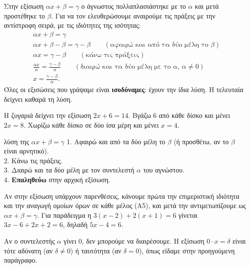 Στην εξίσωση $\alpha x+\beta=\gamma$ ο άγνωστος πολλαπλασιάστηκε με το $\alpha$ και μετά προστέθηκε το $\beta$. Για να τον ελευθερώσουμε αναιρούμε τις πράξεις με την αντίστροφη σειρά, με τις ιδιότητες της ισότητας:
\begin{gather*}
\alpha x+\beta=\gamma\\
\alpha x+\beta-\beta=\gamma-\beta\qquad(\text{αφαιρώ και από τα δύο μέλη το }\beta)\\
\alpha x=\gamma-\beta\qquad(\text{κάνω τις πράξεις})\\
\frac{\alpha x}{\alpha}=\frac{\gamma-\beta}{\alpha}\qquad(\text{διαιρώ και τα δύο μέλη με το }\alpha,\ \alpha\neq0)\\
x=\frac{\gamma-\beta}{\alpha}.
\end{gather*}
Όλες οι εξισώσεις που γράψαμε είναι \textbf{ισοδύναμες}: έχουν την ίδια λύση. Η τελευταία δείχνει καθαρά τη λύση.

\begin{center}
\quad\raisebox{6mm}{$\Rightarrow$}\quad
{}
\quad\raisebox{6mm}{$\Rightarrow$}\quad
{}
\end{center}
Η ζυγαριά δείχνει την εξίσωση $2x+6=14$. Βγάζω $6$ από κάθε δίσκο και μένει $2x=8$. Χωρίζω κάθε δίσκο σε δύο ίσα μέρη και μένει $x=4$.

\begin{kanonas}{λύση της $\alpha x+\beta=\gamma$}
1. Αφαιρώ και από τα δύο μέλη το $\beta$ (ή προσθέτω, αν το $\beta$ είναι αρνητικό).\\
2. Κάνω τις πράξεις.\\
3. Διαιρώ και τα δύο μέλη με τον συντελεστή $\alpha$ του αγνώστου.\\
4. \textbf{Επαληθεύω} στην αρχική εξίσωση.
\end{kanonas}


Αν στην εξίσωση υπάρχουν παρενθέσεις, κάνουμε πρώτα την επιμεριστική ιδιότητα και την αναγωγή ομοίων όρων σε κάθε μέλος (Α5), και μετά την αντιμετωπίζουμε ως $\alpha x+\beta=\gamma$. Για παράδειγμα η $3(x-2)+2(x+1)=6$ γίνεται $3x-6+2x+2=6$, δηλαδή $5x-4=6$.


Αν ο συντελεστής $\alpha$ γίνει $0$, δεν μπορούμε να διαιρέσουμε. Η εξίσωση $0\cdot x=\delta$ είναι τότε αδύνατη (αν $\delta\neq0$) ή ταυτότητα (αν $\delta=0$), όπως είδαμε στην προηγούμενη παράγραφο.

